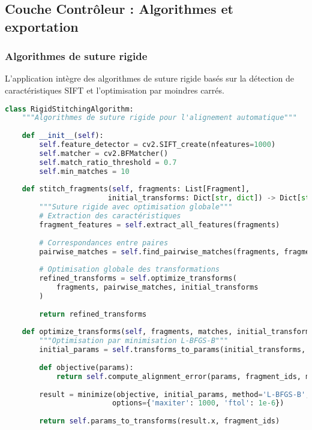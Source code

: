 \documentclass[12pt,a4paper]{report}
\begin{document}
\subsection{Couche Contrôleur : Algorithmes et exportation}

\subsubsection{Algorithmes de suture rigide}

L'application intègre des algorithmes de suture rigide basés sur la détection de caractéristiques SIFT et l'optimisation par moindres carrés.

\begin{lstlisting}[language=Python, caption=Algorithme de suture rigide automatique]
class RigidStitchingAlgorithm:
    """Algorithmes de suture rigide pour l'alignement automatique"""
    
    def __init__(self):
        self.feature_detector = cv2.SIFT_create(nfeatures=1000)
        self.matcher = cv2.BFMatcher()
        self.match_ratio_threshold = 0.7
        self.min_matches = 10
        
    def stitch_fragments(self, fragments: List[Fragment], 
                        initial_transforms: Dict[str, dict]) -> Dict[str, dict]:
        """Suture rigide avec optimisation globale"""
        # Extraction des caractéristiques
        fragment_features = self.extract_all_features(fragments)
        
        # Correspondances entre paires
        pairwise_matches = self.find_pairwise_matches(fragments, fragment_features)
        
        # Optimisation globale des transformations
        refined_transforms = self.optimize_transforms(
            fragments, pairwise_matches, initial_transforms
        )
        
        return refined_transforms
    
    def optimize_transforms(self, fragments, matches, initial_transforms):
        """Optimisation par minimisation L-BFGS-B"""
        initial_params = self.transforms_to_params(initial_transforms, fragment_ids)
        
        def objective(params):
            return self.compute_alignment_error(params, fragment_ids, matches)
        
        result = minimize(objective, initial_params, method='L-BFGS-B',
                         options={'maxiter': 1000, 'ftol': 1e-6})
        
        return self.params_to_transforms(result.x, fragment_ids)
\end{lstlisting}
\end{document}
